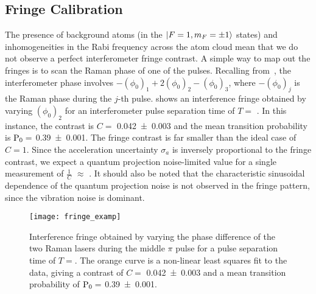 \subsection{Fringe Calibration}\label{sec:fringe_cal}
The presence of background atoms (in the $\ket{F=1,m_F=\pm 1}$ states) and inhomogeneities in the Rabi
frequency across the atom cloud mean that we do not observe a perfect
interferometer fringe contrast. A simple way to map out the fringes is
to scan the Raman phase of one of the pulses\nocite{Peters2001}. 
Recalling from~, the interferometer
phase involves $-(\phi_0)_1
+2(\phi_0)_2 - (\phi_0)_3$, where $-(\phi_0)_j$ is the Raman phase 
during the $j$-th pulse.  shows an interference fringe obtained by
varying \((\phi_0)_2\) for an interferometer pulse separation time of
$T=$ . In this instance, the contrast is $C=$
\num{0.042\pm0.003} and the mean
transition probability is $\textnormal{P}_0 =$
 \num{0.39\pm0.001}. The fringe contrast is far smaller than the ideal
 case of $C = 1$. Since the acceleration uncertainty $\sigma_a$ is inversely
 proportional to the fringe contrast, we expect a quantum projection
 noise-limited value for a single measurement of $\frac{1}{C} $
  $\approx$
 . It should also be noted
 that the characteristic sinusoidal dependence of the quantum
 projection noise is not observed in the fringe pattern, since the
 vibration noise is dominant\nocite{Sugarbaker2013}.
\begin{figure}[htpb!]
  \centering
  \texttt{[image: fringe\_examp]}
  \caption[Interference fringe for \(T = \).]{Interference fringe obtained by varying the phase
    difference of the two Raman lasers during the middle \(\pi\) pulse
    for a pulse separation time of \(T = \). The orange
curve is a non-linear least squares fit to the data, giving a contrast
of $C=$ \num{0.042\pm0.003} and a mean
transition probability of $\textnormal{P}_0 =$
 \num{0.39\pm0.001}.}
 \label{fig:fringe_examp}
\end{figure}
